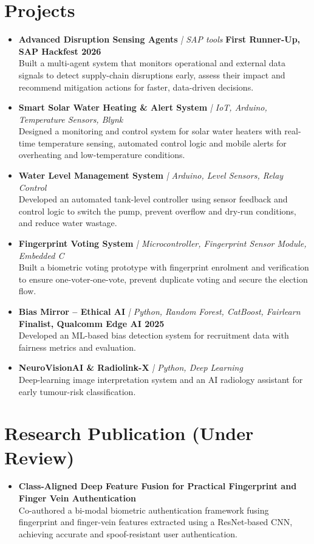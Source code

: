 \documentclass[a4paper,10pt]{article}
\newcommand{\project}[3]{\item \textbf{#1} \textit{\small| #2} \hfill {\small\textbf{#3}}\\}
\begin{document}
\section{Projects}
\begin{itemize}

\project{Advanced Disruption Sensing Agents}{SAP tools}{First Runner-Up, SAP Hackfest 2026}
Built a multi-agent system that monitors operational and external data signals to detect supply-chain
disruptions early, assess their impact and recommend mitigation actions for faster, data-driven decisions.

\project{Smart Solar Water Heating \& Alert System}{IoT, Arduino, Temperature Sensors, Blynk}{}
Designed a monitoring and control system for solar water heaters with real-time temperature sensing,
automated control logic and mobile alerts for overheating and low-temperature conditions.

\project{Water Level Management System}{Arduino, Level Sensors, Relay Control}{}
Developed an automated tank-level controller using sensor feedback and control logic to switch the pump,
prevent overflow and dry-run conditions, and reduce water wastage.

\project{Fingerprint Voting System}{Microcontroller, Fingerprint Sensor Module, Embedded C}{}
Built a biometric voting prototype with fingerprint enrolment and verification to ensure one-voter-one-vote,
prevent duplicate voting and secure the election flow.

\project{Bias Mirror -- Ethical AI}{Python, Random Forest, CatBoost, Fairlearn}{Finalist, Qualcomm Edge AI 2025}
Developed an ML-based bias detection system for recruitment data with fairness metrics and evaluation.

\project{NeuroVisionAI \& Radiolink-X}{Python, Deep Learning}{}
Deep-learning image interpretation system and an AI radiology assistant for early tumour-risk classification.

\end{itemize}

\section{Research Publication (Under Review)}
\begin{itemize}
\item \textbf{Class-Aligned Deep Feature Fusion for Practical Fingerprint and Finger Vein Authentication} \\
Co-authored a bi-modal biometric authentication framework fusing fingerprint and finger-vein features
extracted using a ResNet-based CNN, achieving accurate and spoof-resistant user authentication.
\end{itemize}
\end{document}
